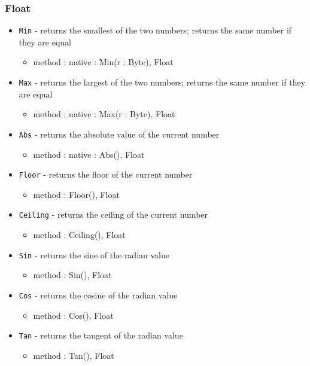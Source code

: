 \documentclass[12pt]{article}
\begin{document}
\subsubsection{Float}
\begin{itemize}
    \item \texttt{Min} - returns the smallest of the two numbers; returns the same number if they are equal
    	\begin{itemize}
	\item method : native : Min(r : Byte), Float
	\end{itemize}
    \item \texttt{Max} - returns the largest of the two numbers; returns the same number if they are equal
    	\begin{itemize}
	\item method : native : Max(r : Byte), Float
	\end{itemize}
    \item \texttt{Abs} - returns the absolute value of the current number
    	\begin{itemize}
	\item method : native : Abs(), Float
	\end{itemize}
    \item \texttt{Floor} - returns the floor of the current number
    	\begin{itemize}
	\item method : Floor(), Float
	\end{itemize}
    \item \texttt{Ceiling} - returns the ceiling of the current number
    	\begin{itemize}
	\item method : Ceiling(), Float
	\end{itemize}
    \item \texttt{Sin} - returns the sine of the radian value
    	\begin{itemize}
	\item method : Sin(), Float
	\end{itemize}
    \item \texttt{Cos} - returns the cosine of the radian value
    	\begin{itemize}
	\item method : Cos(), Float
	\end{itemize}
    \item \texttt{Tan} - returns the tangent of the radian value
    	\begin{itemize}
	\item method : Tan(), Float

\end{itemize}
\end{itemize}
\end{document}
